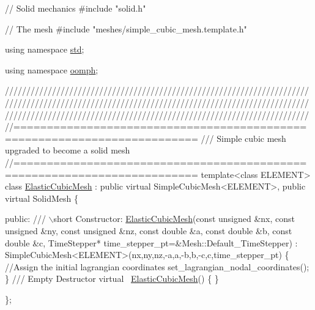 \begin{DoxyCodeInclude}
\textcolor{comment}{// Solid mechanics}
\textcolor{preprocessor}{#include "solid.h"}

\textcolor{comment}{// The mesh }
\textcolor{preprocessor}{#include "meshes/simple\_cubic\_mesh.template.h"}

\textcolor{keyword}{using namespace }\hyperlink{namespacestd}{std};

\textcolor{keyword}{using namespace }\hyperlink{namespaceoomph}{oomph};

\textcolor{comment}{}
\textcolor{comment}{///////////////////////////////////////////////////////////////////////}
\textcolor{comment}{///////////////////////////////////////////////////////////////////////}
\textcolor{comment}{///////////////////////////////////////////////////////////////////////}
\textcolor{comment}{}
\textcolor{comment}{//=========================================================================}\textcolor{comment}{}
\textcolor{comment}{/// Simple cubic mesh upgraded to become a solid mesh}
\textcolor{comment}{}\textcolor{comment}{//=========================================================================}
\textcolor{keyword}{template}<\textcolor{keyword}{class} ELEMENT>
\textcolor{keyword}{class }\hyperlink{classElasticCubicMesh}{ElasticCubicMesh} : \textcolor{keyword}{public} \textcolor{keyword}{virtual} SimpleCubicMesh<ELEMENT>, 
                         \textcolor{keyword}{public} \textcolor{keyword}{virtual} SolidMesh 
\{

\textcolor{keyword}{public}:
\textcolor{comment}{}
\textcolor{comment}{ /// \(\backslash\)short Constructor: }
\textcolor{comment}{} \hyperlink{classElasticCubicMesh}{ElasticCubicMesh}(\textcolor{keyword}{const} \textcolor{keywordtype}{unsigned} &nx, \textcolor{keyword}{const} \textcolor{keywordtype}{unsigned} &ny, \textcolor{keyword}{const} \textcolor{keywordtype}{unsigned} &nz,
                  \textcolor{keyword}{const} \textcolor{keywordtype}{double} &a, \textcolor{keyword}{const} \textcolor{keywordtype}{double} &b, \textcolor{keyword}{const} \textcolor{keywordtype}{double} &c,
                  TimeStepper* time\_stepper\_pt=&Mesh::Default\_TimeStepper) :
  SimpleCubicMesh<ELEMENT>(nx,ny,nz,-a,a,-b,b,-c,c,time\_stepper\_pt)
  \{
   \textcolor{comment}{//Assign the initial lagrangian coordinates}
   set\_lagrangian\_nodal\_coordinates();
  \}
\textcolor{comment}{}
\textcolor{comment}{ /// Empty Destructor}
\textcolor{comment}{} \textcolor{keyword}{virtual} ~\hyperlink{classElasticCubicMesh}{ElasticCubicMesh}() \{ \}

\};




\end{DoxyCodeInclude}

